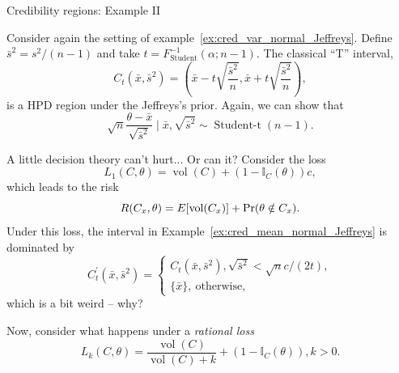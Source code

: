 \begin{frame}{Credibility regions: Example II}
\begin{example}
\label{ex:cred_mean_normal_Jeffreys}
 Consider again the setting of example~\ref{ex:cred_var_normal_Jeffreys}.
 Define $\bar{s}^2 = s^2/(n-1)$ and take $t = F_{\text{Student}}^{-1}(\alpha; n-1)$.
 The classical ``T'' interval,
 \begin{equation*}
  C_t(\bar{x}, \bar{s}^2) = \left(\bar{x} - t\sqrt{\frac{\bar{s}^2}{n}}, \bar{x} + t\sqrt{\frac{\bar{s}^2}{n}}\right),
 \end{equation*}
 is a HPD region under the Jeffreys's prior.
 Again, we can show that
 \begin{equation*}
  \sqrt{n}\frac{\theta -\bar{x}}{\sqrt{\bar{s}^2}} \mid \bar{x}, \sqrt{\bar{s}^2} \sim \operatorname{Student-t}(n-1).
 \end{equation*}
\end{example}
 
\end{frame}
\begin{frame}{A little decision theory can't hurt... Or can it?}
 Consider the loss
 \begin{equation*}
  L_1(C, \theta) = \operatorname{vol}(C) + (1-\mathbb{I}_{C}(\theta))c,
 \end{equation*}
 which leads to the risk
 \begin{equation*}
  R(C_x, \theta) = E[\operatorname{vol}(C_x)] + \operatorname{Pr}(\theta \notin C_x).
 \end{equation*}
Under this loss, the interval in Example~\ref{ex:cred_mean_normal_Jeffreys} is dominated by 
\begin{equation*}
 C_t^\prime(\bar{x}, \bar{s}^2) = \begin{cases}
C_t(\bar{x}, \bar{s}^2), \sqrt{\bar{s}^2} < \sqrt{n}c/(2t),\\
\{\bar{x}\}, \: \text{otherwise},
\end{cases}
\end{equation*}
which is a bit weird -- why?

Now, consider what happens under a \textit{rational loss}
\begin{equation*}
 L_k(C, \theta) = \frac{\operatorname{vol}(C)}{\operatorname{vol}(C) + k} + (1-\mathbb{I}_{C}(\theta)), k >0.
\end{equation*}
\end{frame}
